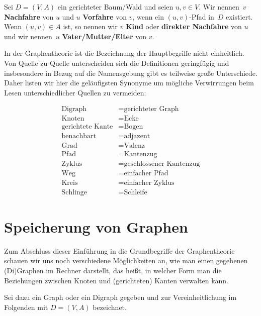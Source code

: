 \begin{defn}
Sei $D=(V,A)$ ein gerichteter Baum/Wald und seien $u,v \in V$.
Wir nennen~$v$ \textbf{Nachfahre} von $u$ und $u$ \textbf{Vorfahre} von $v$, wenn ein $(u,v)$-Pfad in~$D$ existiert.
Wenn $(u,v) \in A$ ist, so nennen wir $v$ \textbf{Kind} oder \textbf{direkter Nachfahre} von $u$ und wir nennen~$u$ \textbf{Vater/Mutter/Elter} von $v$.
\end{defn} 


\begin{bem}
In der Graphentheorie ist die Bezeichnung der Hauptbegriffe nicht einheitlich.
Von Quelle zu Quelle unterscheiden sich die Definitionen geringfügig und insbesondere in Bezug auf die Namensgebung gibt es teilweise große Unterschiede.
Daher listen wir hier die geläufigsten Synonyme um mögliche Verwirrungen beim Lesen unterschiedlicher Quellen zu vermeiden:

\begin{align*}
\text{Digraph} &= \text{gerichteter Graph}\\
\text{Knoten} &= \text{Ecke}\\
\text{gerichtete Kante} &= \text{Bogen}\\
\text{benachbart} &= \text{adjazent}\\
\text{Grad} &= \text{Valenz}\\
\text{Pfad} &= \text{Kantenzug}\\
\text{Zyklus} &= \text{geschlossener Kantenzug}\\
\text{Weg} &= \text{einfacher Pfad}\\
\text{Kreis} &= \text{einfacher Zyklus}\\
\text{Schlinge} &= \text{Schleife}
\end{align*}
\end{bem}


\section{Speicherung von Graphen} 

\begin{bem}
Zum Abschluss dieser Einführung in die Grundbegriffe der Graphentheorie schauen wir uns noch verschiedene Möglichkeiten an, wie man einen gegebenen (Di)Graphen im Rechner darstellt, das heißt, in welcher Form man die Beziehungen zwischen Knoten und (gerichteten) Kanten verwalten kann.

Sei dazu ein Graph oder ein Digraph gegeben und zur Vereinheitlichung im Folgenden mit $D=(V,A)$ bezeichnet.
\end{bem} 

